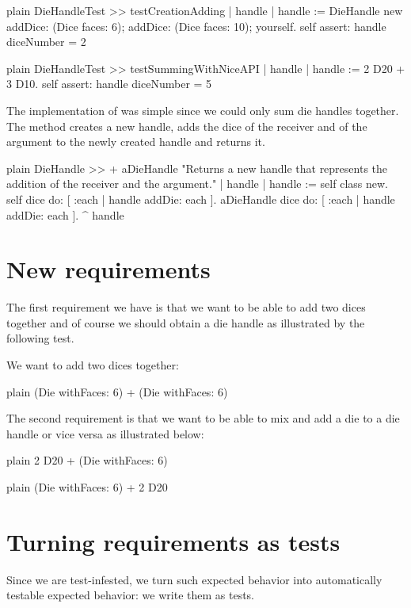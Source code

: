 \documentclass[10pt,twoside,english]{_support/latex/sbabook/sbabook}
\begin{document}
\begin{displaycode}{plain}
DieHandleTest >> testCreationAdding
	| handle |
	handle := DieHandle new
		addDice: (Dice faces: 6);
		addDice: (Dice faces: 10);
		yourself.
	self assert: handle diceNumber = 2
\end{displaycode}

\begin{displaycode}{plain}
DieHandleTest >> testSummingWithNiceAPI
	| handle |
	handle := 2 D20 + 3 D10.
	self assert: handle diceNumber = 5
\end{displaycode}

The implementation of \textcode{+} was simple since we could only sum die handles together. The method \textcode{+} creates a new handle, adds the dice of the receiver and of the argument to the newly created handle and returns it. 

\begin{displaycode}{plain}
DieHandle >> + aDieHandle
	"Returns a new handle that represents the addition of the receiver and the argument."
	| handle |
	handle := self class new.
	self dice do: [ :each | handle addDie: each ].
	aDieHandle dice do: [ :each | handle addDie: each ].
	^ handle
\end{displaycode}
\section{New requirements }
The first requirement we have is that we want to be able to add two dices together and of course we should obtain a die handle as illustrated by the following test. 

We want to add two dices together:

\begin{displaycode}{plain}
(Die withFaces: 6) + (Die withFaces: 6)
\end{displaycode}

The second requirement is that we want to be able to mix and add a die to a die handle or vice versa as illustrated below: 

\begin{displaycode}{plain}
2 D20 + (Die withFaces: 6)
\end{displaycode}

\begin{displaycode}{plain}
 (Die withFaces: 6) + 2 D20
\end{displaycode}
\section{Turning requirements as tests}
Since we are test-infested, we turn such expected behavior into automatically testable expected behavior: we write them as tests. 
\end{document}
